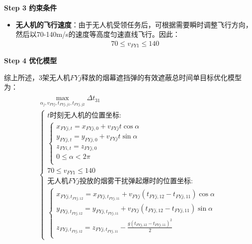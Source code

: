 \documentclass[../main.tex]{subfiles}
\begin{document}
\noindent \textbf{Step 3 约束条件}
\begin{itemize}
\item \textbf{无人机的飞行速度}：由于无人机受领任务后，可根据需要瞬时调整飞行方向，然后以70-140m/s的速度等高度匀速直线飞行。因此：
\begin{align}\label{11.8}
  70 \leq v_{FY1} \leq 140
\end{align}
\end{itemize}
\textbf{Step 4 优化模型}
\par 综上所述，3架无人机$FYj$释放的烟幕遮挡弹的有效遮蔽总时间单目标优化模型为：
\begin{align}
  \begin{array}{c}
  \underset{\alpha_j ,v_{FYj},t_{FYj,j1},t_{FYj,j2}}{\max}\Delta t_{31}
  \\
\left\{ \begin{array}{l}
	t\text{时刻无人机的位置坐标:}\\
	\left\{ \begin{array}{l}
x_{FYj,t} = x_{FYj,0} + v_{FYj} t \cos\alpha \\
y_{FYj,t} = y_{FYj,0} + v_{FYj} t \sin\alpha \\
z_{FYi,t} = z_{FYj,0}\\
0\leq \alpha < 2\pi \\
\end{array} \right.\\
  70 \leq v_{FY1} \leq 140\\
	\text{无人机}FYj\text{投放的烟雾干扰弹起爆时的位置坐标:}\\
	\left\{ \begin{array}{l}
	x_{FYj,t_{FYj,12}}=x_{FYj,t_{FYj,11}}+v_{FYj}\left( t_{FYj,12}-t_{FYj,11} \right) \cos \alpha\\
	y_{FYj,t_{FYj,12}}=y_{FYj,t_{FYj,11}}+v_{FYj}\left( t_{FYj,12}-t_{FYj,11} \right) \sin \alpha\\
	z_{FYj,t_{FYj,12}}=z_{FYj,t_{FYj,11}}-\frac{g\left( t_{FYj,12}-t_{FYj,11} \right) ^2}{2}\\
\end{array} \right. 
\end{array} \right.  
\end{array}
\end{align}


  
\end{document}
